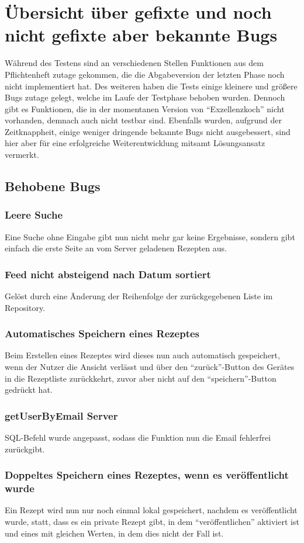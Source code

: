 \chapter{Übersicht über gefixte und noch nicht gefixte aber bekannte Bugs}

Während des Testens sind an verschiedenen Stellen Funktionen aus dem Pflichtenheft zutage gekommen, die die Abgabeversion der letzten Phase noch nicht implementiert hat. Des weiteren haben die Tests einige kleinere und größere Bugs zutage gelegt, welche im Laufe der Testphase behoben wurden. Dennoch gibt es Funktionen, die in der momentanen Version von "`Exzellenzkoch"' nicht vorhanden, demnach auch nicht testbar sind. Ebenfalls wurden, aufgrund der Zeitknappheit, einige weniger dringende bekannte Bugs nicht ausgebessert, sind hier aber für eine erfolgreiche Weiterentwicklung mitsamt Lösungsansatz vermerkt.


\section{Behobene Bugs}
\subsection{Leere Suche}
Eine Suche ohne Eingabe gibt nun nicht mehr gar keine Ergebnisse, sondern gibt einfach die erste Seite an vom Server geladenen Rezepten aus.
\subsection{Feed nicht absteigend nach Datum sortiert}
Gelöst durch eine Änderung der Reihenfolge der zurückgegebenen Liste im Repository.
\subsection{Automatisches Speichern eines Rezeptes}
Beim Erstellen eines Rezeptes wird dieses nun auch automatisch gespeichert, wenn der Nutzer die Ansicht verlässt und über den "`zurück"'-Button des Gerätes in die Rezeptliste zurückkehrt, zuvor aber nicht auf den "`speichern"'-Button gedrückt hat.
\subsection{getUserByEmail Server} SQL-Befehl wurde angepasst, sodass die Funktion nun die Email fehlerfrei zurückgibt.
\subsection{Doppeltes Speichern eines Rezeptes, wenn es veröffentlicht wurde}
Ein Rezept wird nun nur noch einmal lokal gespeichert, nachdem es veröffentlicht wurde, statt, dass es ein private Rezept gibt, in dem "`veröffentlichen"' aktiviert ist und eines mit gleichen Werten, in dem dies nicht der Fall ist.
